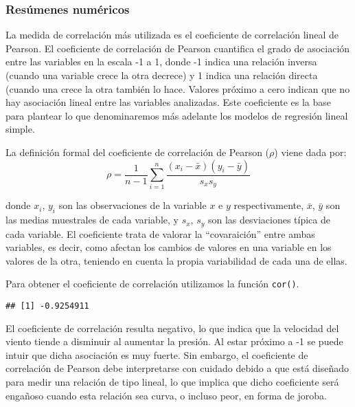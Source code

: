 \documentclass[
]{book}
\newenvironment{Shaded}{\begin{snugshade}}{\end{snugshade}}
\newcommand{\FunctionTok}[1]{\textcolor[rgb]{0.00,0.00,0.00}{#1}}
\newcommand{\NormalTok}[1]{#1}
\newcommand{\SpecialCharTok}[1]{\textcolor[rgb]{0.00,0.00,0.00}{#1}}
\begin{document}
\hypertarget{resuxfamenes-numuxe9ricos-4}{%
\subsubsection{Resúmenes numéricos}\label{resuxfamenes-numuxe9ricos-4}}

La medida de correlación más utilizada es el coeficiente de correlación lineal de Pearson. El coeficiente de correlación de Pearson cuantifica el grado de asociación entre las variables en la escala -1 a 1, donde -1 indica una relación inversa (cuando una variable crece la otra decrece) y 1 indica una relación directa (cuando una crece la otra también lo hace. Valores próximo a cero indican que no hay asociación lineal entre las variables analizadas. Este coeficiente es la base para plantear lo que denominaremos más adelante los modelos de regresión lineal simple.

La definición formal del coeficiente de correlación de Pearson (\(\rho\)) viene dada por: \begin{equation} 
  \rho = \frac{1}{n-1}\sum_{i=1}^n \frac{(x_i - \bar{x})(y_i - \bar{y})}{s_x s_y}
  \label{eq:coefcorrel}
\end{equation}

donde \(x_i\), \(y_i\) son las observaciones de la variable \(x\) e \(y\) respectivamente, \(\bar{x}\), \(\bar{y}\) son las medias muestrales de cada variable, y \(s_x\), \(s_y\) son las desviaciones típica de cada variable. El coeficiente trata de valorar la ``covaraición'' entre ambas variables, es decir, como afectan los cambios de valores en una variable en los valores de la otra, teniendo en cuenta la propia variabilidad de cada una de ellas.

Para obtener el coeficiente de correlación utilizamos la función \texttt{cor()}.

\begin{Shaded}
\end{Shaded}

\begin{verbatim}
## [1] -0.9254911
\end{verbatim}

El coeficiente de correlación resulta negativo, lo que indica que la velocidad del viento tiende a disminuir al aumentar la presión. Al estar próximo a -1 se puede intuir que dicha asociación es muy fuerte. Sin embargo, el coeficiente de correlación de Pearson debe interpretarse con cuidado debido a que está diseñado para medir una relación de tipo lineal, lo que implica que dicho coeficiente será engañoso cuando esta relación sea curva, o incluso peor, en forma de joroba.
\end{document}
